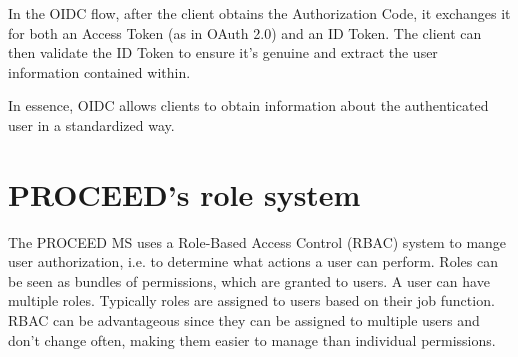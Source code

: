 %

In the OIDC flow, after the client obtains the Authorization Code,
it exchanges it for both an Access Token (as in OAuth 2.0) and an ID Token.
The client can then validate the ID Token to ensure it's genuine and extract the user information contained within.


%


In essence, OIDC allows clients to obtain information about the authenticated user in a standardized way.

\section{PROCEED's role system}
\label{cha:relatedwork:proceedroles}

The PROCEED MS uses a Role-Based Access Control (RBAC) system to mange user authorization,
i.e. to determine what actions a user can perform.
Roles can be seen as bundles of permissions, which are granted to users.
A user can have multiple roles.
Typically roles are assigned to users based on their job function.
RBAC can be advantageous since they can be assigned to multiple users and 
don't change often, making them easier to manage than individual permissions.

